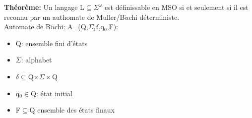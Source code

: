 \medskip
\textbf{Th\'eor\`eme:} Un langage L$\subseteq\Sigma^\omega$ est d\'efinissable en MSO si et seulement si il
est reconnu par un authomate de Muller/B$\ddot{u}$chi d\'eterministe.\\
Automate de B$\ddot{u}$chi: A=(Q,$\Sigma$,$\delta$,q$_0$,F):
\begin{itemize}
  \item Q: ensemble fini d'\'etats
  \item $\Sigma$: alphabet
  \item $\delta\subseteq$Q$\times\Sigma\times$Q
  \item q$_0\in$Q: \'etat initial
  \item F$\subseteq$Q ensemble des \'etats finaux
\end{itemize}
